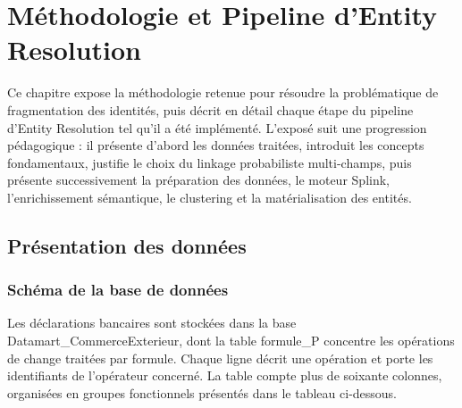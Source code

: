 \chapter{Méthodologie et Pipeline d'Entity Resolution}

Ce chapitre expose la méthodologie retenue pour résoudre la problématique de fragmentation des identités, puis décrit en détail chaque étape du pipeline d'Entity Resolution tel qu'il a été implémenté. L'exposé suit une progression pédagogique : il présente d'abord les données traitées, introduit les concepts fondamentaux, justifie le choix du linkage probabiliste multi-champs, puis présente successivement la préparation des données, le moteur Splink, l'enrichissement sémantique, le clustering et la matérialisation des entités.

\section{Présentation des données}

\subsection{Schéma de la base de données}

Les déclarations bancaires sont stockées dans la base Datamart\_CommerceExterieur, dont la table formule\_P concentre les opérations de change traitées par formule. Chaque ligne décrit une opération et porte les identifiants de l'opérateur concerné. La table compte plus de soixante colonnes, organisées en groupes fonctionnels présentés dans le tableau ci-dessous.

